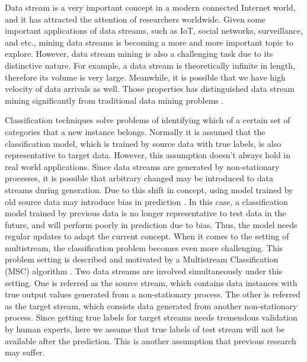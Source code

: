 Data stream is a very important concept in a modern connected Internet 
world, and it has attracted the attention of researchers worldwide. Given some important
applications of data streams, such as IoT, social networks, surveillance, and etc.,
mining data streams is becoming a more and more important topic to explore. 
However, data stream mining is also a challenging task due to its distinctive nature. 
For example, a data stream is theoretically infinite in length, therefore its volume
is very large. Meanwhile, it is possible that we have high velocity of data arrivals as well. Those properties has distinguished data 
stream mining significantly from traditional data mining problems \cite{haque2016SAND}.


Classification techniques solve problems of identifying which of a certain set of categories
that a new instance belongs. Normally it is assumed that the classification model, which is
trained by source data with true labels, is also representative to target data.
However, this assumption doesn't always hold in real world applications. Since data streams are generated
by non-stationary processes, it is possible that arbitrary changed may be introduced to data streams during generation. 
Due to this shift in concept, using model trained by old source data may introduce bias
in prediction \cite{herlihy1993methodology}.
In this case, a classification model trained by previous data is no longer representative to test
data in the future, and will perform poorly in prediction due to bias. Thus, the model needs regular updates to adapt the current concept.
When it comes to the setting of multistream, the classification problem becomes even
more challenging. This problem setting is described and motivated by a Multistream
Classification (MSC) algorithm \cite{chandra2016adaptive}. Two data streams are
involved simultaneously under this setting. One is referred as the source stream,
which contains data instances with true output values generated from a non-stationary
process. The other is referred as the target stream, which consists data generated
from another non-stationary process. Since getting true labels for target streams needs tremendous validation by human experts, here
we assume that true labels of test stream will not be available after the prediction. This is another assumption that previous research may suffer. 

